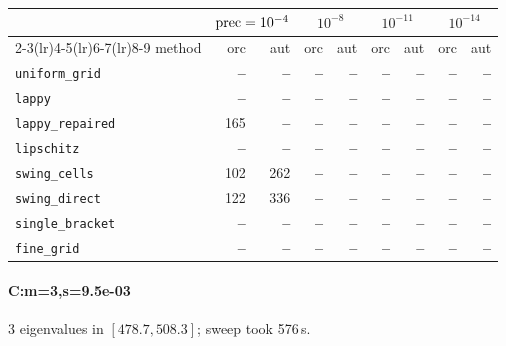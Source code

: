 \begin{center}
\small
\begin{tabular}{lrrrrrrrr}
\toprule
& \multicolumn{2}{c}{$\mathrm{prec}=10^{-4}$} & \multicolumn{2}{c}{$10^{-8}$} & \multicolumn{2}{c}{$10^{-11}$} & \multicolumn{2}{c}{$10^{-14}$} \\
\cmidrule(lr){2-3}\cmidrule(lr){4-5}\cmidrule(lr){6-7}\cmidrule(lr){8-9}
method & orc & aut & orc & aut & orc & aut & orc & aut \\
\midrule
\texttt{uniform\_grid} & \textbf{--} & \textbf{--} & \textbf{--} & \textbf{--} & \textbf{--} & \textbf{--} & \textbf{--} & \textbf{--} \\
\texttt{lappy} & \textbf{--} & \textbf{--} & \textbf{--} & \textbf{--} & \textbf{--} & \textbf{--} & \textbf{--} & \textbf{--} \\
\texttt{lappy\_repaired} & 165 & \textbf{--} & \textbf{--} & \textbf{--} & \textbf{--} & \textbf{--} & \textbf{--} & \textbf{--} \\
\texttt{lipschitz} & \textbf{--} & \textbf{--} & \textbf{--} & \textbf{--} & \textbf{--} & \textbf{--} & \textbf{--} & \textbf{--} \\
\texttt{swing\_cells} & 102 & 262 & \textbf{--} & \textbf{--} & \textbf{--} & \textbf{--} & \textbf{--} & \textbf{--} \\
\texttt{swing\_direct} & 122 & 336 & \textbf{--} & \textbf{--} & \textbf{--} & \textbf{--} & \textbf{--} & \textbf{--} \\
\midrule
\texttt{single\_bracket} & \textbf{--} & \textbf{--} & \textbf{--} & \textbf{--} & \textbf{--} & \textbf{--} & \textbf{--} & \textbf{--} \\
\texttt{fine\_grid} & \textbf{--} & \textbf{--} & \textbf{--} & \textbf{--} & \textbf{--} & \textbf{--} & \textbf{--} & \textbf{--} \\
\bottomrule
\end{tabular}
\end{center}

\paragraph{C:m=3,s=9.5e-03} 3 eigenvalues in $[478.7, 508.3]$; sweep took 576\,s.

